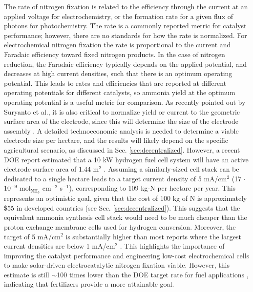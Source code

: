 The rate of nitrogen fixation is related to the efficiency through the current at an applied voltage for electrochemistry, or the formation rate for a given flux of photons for photochemistry. The rate is a commonly reported metric for catalyst performance; however, there are no standards for how the rate is normalized. For electrochemical nitrogen fixation the rate is proportional to the current and Faradaic efficiency toward fixed nitrogen products. In the case of nitrogen reduction, the Faradaic efficiency typically depends on the applied potential, and decreases at high current densities, such that there is an optimum operating potential. This leads to rates and efficiencies that are reported at different operating potentials for different catalysts, so ammonia yield at the optimum operating potential is a useful metric for comparison. As recently pointed out by Suryanto et al., it is also critical to normalize yield or current to the geometric surface area of the electrode, since this will determine the size of the electrode assembly \cite{Suryanto_2019}. A detailed technoeconomic analysis is needed to determine a viable electrode size per hectare, and the results will likely depend on the specific agricultural scenario, as discussed in Sec. \ref{sec:decentralized}. However, a recent DOE report estimated that a 10 kW hydrogen fuel cell system will have an active electrode surface area of 1.44 m$^2$ \cite{fuelcells}. Assuming a similarly-sized cell stack can be dedicated to a single hectare leads to a target current density of 5 mA/cm$^2$ (17 $\cdot$ 10$^{-9}$ mol$_{\mathrm{NH}_3}$ cm$^{-2}$ s$^{-1}$), corresponding to 109 kg-N per hectare per year. This represents an optimistic goal, given that the cost of 100 kg of N is approximately \$55 in developed countries (see Sec. \ref{sec:decentralized}). This suggests that the equivalent ammonia synthesis cell stack would need to be much cheaper than the proton exchange membrane cells used for hydrogen conversion. Moreover, the target of 5 mA/cm$^2$ is substantially higher than most reports where the largest current densities are below 1 mA/cm$^2$ \cite{Song_2018, McPherson_2019}. This highlights the importance of improving the catalyst performance and engineering low-cost electrochemical cells to make solar-driven electrocatalytic nitrogen fixation viable. However, this estimate is still $\sim$100 times lower than the DOE target rate for fuel applications \cite{McPherson_2019}, indicating that fertilizers provide a more attainable goal.

